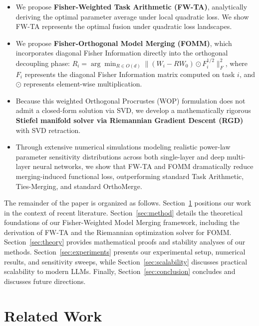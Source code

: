 \documentclass{article}
\theoremstyle{plain}
\theoremstyle{definition}
\theoremstyle{remark}
\begin{document}
\begin{itemize}
    \item We propose \textbf{Fisher-Weighted Task Arithmetic (FW-TA)}, analytically deriving the optimal parameter average under local quadratic loss. We show FW-TA represents the optimal fusion under quadratic loss landscapes.
    \item We propose \textbf{Fisher-Orthogonal Model Merging (FOMM)}, which incorporates diagonal Fisher Information directly into the orthogonal decoupling phase: $R_i = \arg \min_{R \in O(d)} \|(W_i - R W_0) \odot F_i^{1/2}\|_F^2$, where $F_i$ represents the diagonal Fisher Information matrix computed on task $i$, and $\odot$ represents element-wise multiplication.
    \item Because this weighted Orthogonal Procrustes (WOP) formulation does not admit a closed-form solution via SVD, we develop a mathematically rigorous \textbf{Stiefel manifold solver via Riemannian Gradient Descent (RGD)} with SVD retraction.
    \item Through extensive numerical simulations modeling realistic power-law parameter sensitivity distributions across both single-layer and deep multi-layer neural networks, we show that FW-TA and FOMM dramatically reduce merging-induced functional loss, outperforming standard Task Arithmetic, Ties-Merging, and standard OrthoMerge.
\end{itemize}

The remainder of the paper is organized as follows. Section~\ref{sec:related} positions our work in the context of recent literature. Section~\ref{sec:method} details the theoretical foundations of our Fisher-Weighted Model Merging framework, including the derivation of FW-TA and the Riemannian optimization solver for FOMM. Section~\ref{sec:theory} provides mathematical proofs and stability analyses of our methods. Section~\ref{sec:experiments} presents our experimental setup, numerical results, and sensitivity sweeps, while Section~\ref{sec:scalability} discusses practical scalability to modern LLMs. Finally, Section~\ref{sec:conclusion} concludes and discusses future directions.

\section{Related Work}
\label{sec:related}
\end{document}
